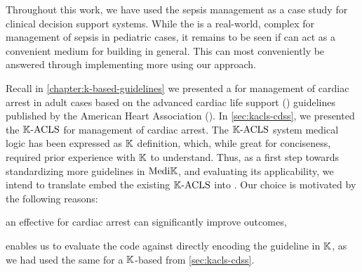 Throughout this work, we have used the sepsis management \BPG{} as
a case study for clinical decision support systems.
While the \BPG{} is a real-world, complex
\CDSSs{} for management of sepsis in pediatric cases, it remains
to be seen if \MediK{} can act as a convenient medium for building \CDSSs{} in general.
This can most conveniently be answered through implementing more \CDSSs{} using
our approach.

Recall in \autoref{chapter:k-based-guidelines} we presented a \CDSS{}
for management of cardiac arrest in adult cases based on the
advanced cardiac life support (\ACLS{}) guidelines published by the American Heart Association (\AHA{}).
In \autoref{sec:kacls-cdss}, we presented the $\mathbb{K}{}\text{-ACLS}{}$ \CDSS{} for
management of cardiac arrest. The $\mathbb{K}{}\text{-ACLS}{}$ system
medical logic has been expressed as $\mathbb{K}$ definition,
which, while great for conciseness, required prior
experience with $\mathbb{K}$ to understand.
Thus, as a first step towards standardizing more guidelines
in $\text{Medi}\mathbb{K}{}{}$, and evaluating its applicability, we intend
to translate embed the existing $\mathbb{K}{}\text{-ACLS}{}$ \BPG{} into
\MediK{}. Our choice
is motivated by the following reasons:
\begin{enumerate*}[label=(\roman*)]
  \item an effective \CDSS{} for cardiac arrest can significantly improve
    outcomes,
  \item enables us to evaluate the \MediK{} code against directly encoding
    the guideline in $\mathbb{K}$, as we had used the same \BPG{} for a $\mathbb{K}$-based \CDSSs{}
    from \autoref{sec:kacls-cdss}.
\end{enumerate*}








%
%

